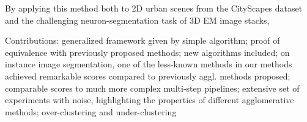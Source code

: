  
By applying this method both to 2D urban scenes from the CityScapes dataset and the challenging neuron-segmentation task of 3D EM image stacks, 

Contributions: generalized framework given by simple algorithm; proof of equivalence with previously proposed methods; new algorithms included; on instance image segmentation, one of the less-known methods in our methods achieved remarkable scores compared to previously aggl. methods proposed; comparable scores to much more complex multi-step pipelines; extensive set of experiments with noise, highlighting the properties of different agglomerative methods; over-clustering and under-clustering


